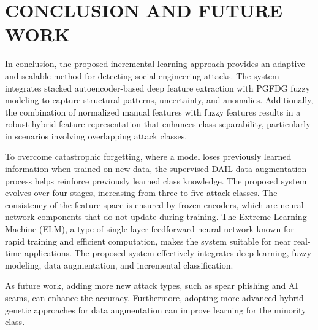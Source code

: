 \chapter{CONCLUSION AND FUTURE WORK}


In conclusion, the proposed incremental learning approach provides an adaptive and scalable method for detecting social engineering attacks. The system integrates stacked autoencoder-based deep feature extraction with PGFDG fuzzy modeling to capture structural patterns, uncertainty, and anomalies. Additionally, the combination of normalized manual features with fuzzy features results in a robust hybrid feature representation that enhances class separability, particularly in scenarios involving overlapping attack classes.

To overcome catastrophic forgetting, where a model loses previously learned information when trained on new data, the supervised DAIL data augmentation process helps reinforce previously learned class knowledge. The proposed system evolves over four stages, increasing from three to five attack classes. The consistency of the feature space is ensured by frozen encoders, which are neural network components that do not update during training. The Extreme Learning Machine (ELM), a type of single-layer feedforward neural network known for rapid training and efficient computation, makes the system suitable for near real-time applications. The proposed system effectively integrates deep learning, fuzzy modeling, data augmentation, and incremental classification.

As future work, adding more new attack types, such as spear phishing and AI scams, can enhance the accuracy. Furthermore, adopting more advanced hybrid genetic approaches for data augmentation can improve learning for the minority class. 